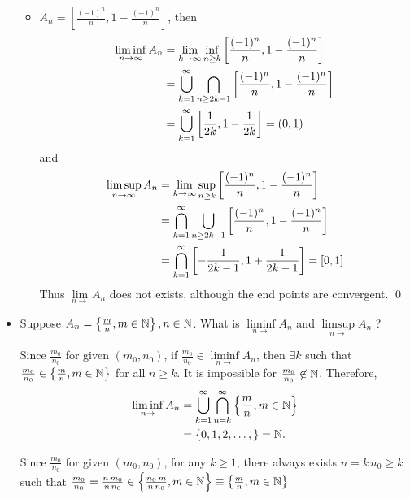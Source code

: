 \documentclass[11pt]{article}
\begin{document}
\begin{itemize}
\begin{example}
\begin{itemize}
\item $A_{n} = \left[ \frac{(-1)^{n}}{n}, 1 - \frac{(-1)^{n}}{n} \right]$,  then 
\begin{align*}
\liminf\limits_{n\rightarrow \infty}A_{n} &= \lim\limits_{k\rightarrow\infty}\inf\limits_{n\ge k}\left[ \frac{(-1)^{n}}{n}, 1 - \frac{(-1)^{n}}{n} \right]\\
&= \bigcup_{k=1}^{\infty}\bigcap_{n\ge 2k-1}\left[ \frac{(-1)^{n}}{n}, 1 - \frac{(-1)^{n}}{n} \right]\\
&= \bigcup_{k=1}^{\infty}\left[\frac{1}{2k}, 1-\frac{1}{2k} \right] = (0,1)
\end{align*}
and 
\begin{align*}
\limsup\limits_{n\rightarrow \infty}A_{n} &= \lim\limits_{k\rightarrow\infty}\sup\limits_{n\ge k}\left[ \frac{(-1)^{n}}{n}, 1 - \frac{(-1)^{n}}{n} \right]\\
&= \bigcap_{k=1}^{\infty}\bigcup_{n\ge 2k-1}\left[ \frac{(-1)^{n}}{n}, 1 - \frac{(-1)^{n}}{n} \right]\\
&= \bigcap_{k=1}^{\infty}\left[-\frac{1}{2k-1}, 1+\frac{1}{2k-1} \right] = [0,1]
\end{align*}
Thus $\lim\limits_{n\rightarrow}A_{n}$ does not exists, although the end points are convergent. \qed
\end{itemize}
\end{example}

\item \begin{example} \citep{resnick2013probability}
Suppose $A_{n}= \left\{\frac{m}{n}, m\in {\mathbb N}\right\}, n\in {\mathbb N}$. What is $\liminf\limits_{n\rightarrow}A_{n}$ and $\limsup\limits_{n\rightarrow}A_{n}$ ?
\end{example}
\begin{solution}
Since $\frac{m_{0}}{n_{0}}$ for given $(m_{0},n_{0})$, if $\frac{m_{0}}{n_{0}}\in \liminf\limits_{n\rightarrow}A_{n}$, then $\exists k$ such that $\frac{m_{0}}{n_{0}}\in \left\{\frac{m}{n}, m\in {\mathbb N}\right\}$ for all $n\ge k$. It is impossible for $\frac{m_{0}}{n_{0}}\not\in {\mathbb N}$. Therefore, 
\begin{align*}
\liminf\limits_{n\rightarrow}A_{n} &= \bigcup_{k=1}^{\infty}\bigcap_{n= k}^{\infty}\left\{\frac{m}{n}, m\in {\mathbb N}\right\}\\
&= \left\{0, 1, 2, \ldots, \right\} = {\mathbb N}.\\
\end{align*}

Since $\frac{m_{0}}{n_{0}}$ for given $(m_{0},n_{0})$, for any $k\ge 1$, there always exists $n= k\,n_{0}\ge k$ such that $\frac{m_{0}}{n_{0}} = \frac{n\,m_{0}}{n\,n_{0}} \in \left\{\frac{n_{0}\,m}{n\,n_{0}}, m\in {\mathbb N}\right\} \equiv  \left\{\frac{m}{n}, m\in {\mathbb N}  \right\} $


\end{solution}
\end{itemize}
\end{document}
